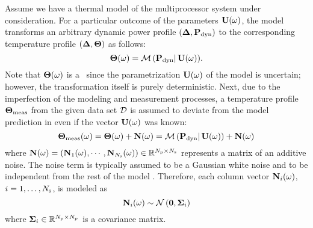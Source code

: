 Assume we have a thermal model of the multiprocessor system under consideration. For a particular outcome of the parameters $\mathbf{U}(\omega)$, the model transforms an arbitrary dynamic power profile $\left(\boldsymbol{\Delta}, \mathbf{P}_{\text{dyn}}\right)$ to the corresponding temperature profile $\profileT$ as follows:
\begin{equation} \elabel{model}
  \mT(\o) = \model{\mP_\dyn}.
\end{equation}
Note that $\boldsymbol\Theta(\omega)$ is a \rv\ since the parametrization $\mathbf{U}(\omega)$ of the model is uncertain; however, the transformation itself is purely deterministic. Next, due to the imperfection of the modeling and measurement processes, a temperature profile $\boldsymbol\Theta_{\text{meas}}$ from the given data set $\mathcal{D}$ is assumed to deviate from the model prediction in  even if the vector $\mathbf{U}(\omega)$ was known:
\[
  \boldsymbol\Theta_{\text{meas}}(\omega) = \boldsymbol\Theta(\omega) + \mathbf{N}(\omega) = \mathcal{M}\left(\mathbf{P}_{\text{dyn}}\right | \mathbf{U}(\omega)) + \mathbf{N}(\omega)
\]
where $\mathbf{N}(\omega) = \left( \mathbf{N}_1(\omega), \cdots, \mathbf{N}_{N_\text{s}}(\omega) \right) \in \mathbb{R}^{{N_\text{p}} \times N_\text{s}}$ represents a matrix of an additive noise. The noise term is typically assumed to be a Gaussian white noise and to be independent from the rest of the model \cite{marzouk2007, el-moselhy2012}. Therefore, each column vector $\mathbf{N}_i(\omega)$, $i = 1, \dotsc, N_\text{s}$, is modeled as
\[
  \mathbf{N}_i(\omega) \sim \mathcal{N}\left(\mathbf{0}, \boldsymbol\Sigma_i\right)
\]
where $\boldsymbol\Sigma_i \in \mathbb{R}^{{N_\text{p}} \times {N_\text{p}}}$ is a covariance matrix.
